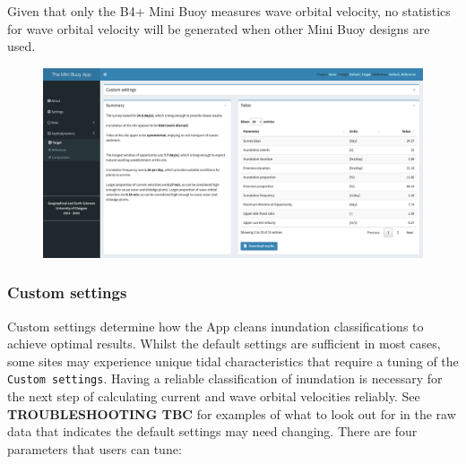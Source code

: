 \documentclass[
  letterpaper,
  DIV=11,
  numbers=noendperiod]{scrreprt}
\begin{document}
\begin{tcolorbox}[enhanced jigsaw, bottomrule=.15mm, leftrule=.75mm, bottomtitle=1mm, breakable, opacityback=0, colback=white, left=2mm, toprule=.15mm, opacitybacktitle=0.6, arc=.35mm, colframe=quarto-callout-note-color-frame, toptitle=1mm, titlerule=0mm, colbacktitle=quarto-callout-note-color!10!white, coltitle=black, title=\textcolor{quarto-callout-note-color}{\faInfo}\hspace{0.5em}{Note}, rightrule=.15mm]

Given that only the B4+ Mini Buoy measures wave orbital velocity, no
statistics for wave orbital velocity will be generated when other Mini
Buoy designs are used.

\end{tcolorbox}

\begin{figure}

{\centering \includegraphics[width=1\textwidth,height=\textheight]{chapters/figs/HydroSingle.png}

}

\end{figure}

\hypertarget{sec-custom}{%
\subsubsection{Custom settings}\label{sec-custom}}

Custom settings determine how the App cleans inundation classifications
to achieve optimal results. Whilst the default settings are sufficient
in most cases, some sites may experience unique tidal characteristics
that require a tuning of the \texttt{Custom\ settings}. Having a
reliable classification of inundation is necessary for the next step of
calculating current and wave orbital velocities reliably. See
\textbf{TROUBLESHOOTING TBC} for examples of what to look out for in the
raw data that indicates the default settings may need changing. There
are four parameters that users can tune:
\end{document}
